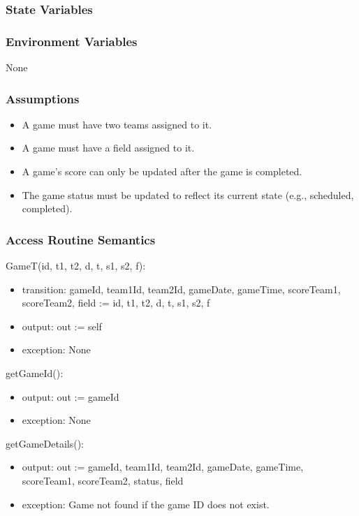 \documentclass[12pt, titlepage]{article}
\begin{document}
\subsubsection{State Variables}

\subsubsection{Environment Variables}
None

\subsubsection{Assumptions}
\begin{itemize}
  \item A game must have two teams assigned to it.
  \item A game must have a field assigned to it.
  \item A game's score can only be updated after the game is completed.
  \item The game status must be updated to reflect its current state (e.g., scheduled, completed).
\end{itemize}

\subsubsection{Access Routine Semantics}

\noindent GameT(id, t1, t2, d, t, s1, s2, f):
\begin{itemize}
  \item transition: gameId, team1Id, team2Id, gameDate, gameTime, scoreTeam1, scoreTeam2, field := id, t1, t2, d, t, s1, s2, f
  \item output: out := self
  \item exception: None
\end{itemize}

\noindent getGameId():
\begin{itemize}
  \item output: out := gameId
  \item exception: None
\end{itemize}

\noindent getGameDetails():
\begin{itemize}
  \item output: out :=  gameId, team1Id, team2Id, gameDate, gameTime, scoreTeam1, scoreTeam2, status, field
  \item exception: Game not found if the game ID does not exist.
\end{itemize}
\end{document}
